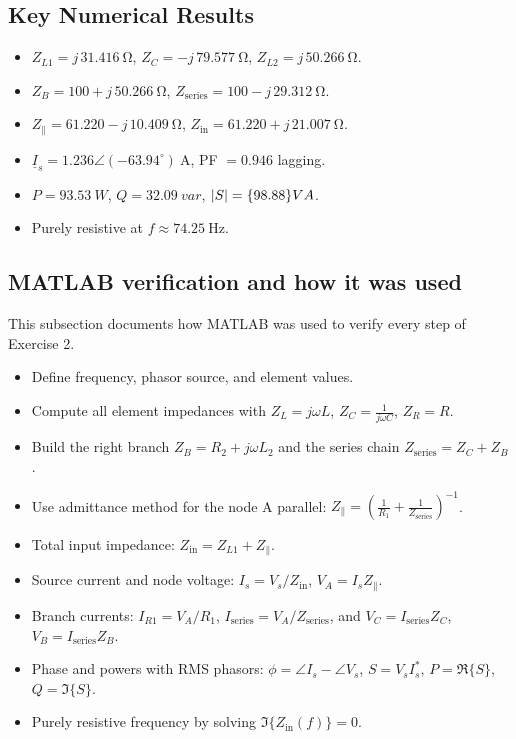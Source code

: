 \documentclass{article}
\begin{document}
\subsection*{Key Numerical Results}

\begin{itemize}
\item $Z_{L1}=j\,31.416\ \si{\ohm}$, $Z_C=-j\,79.577\ \si{\ohm}$, $Z_{L2}=j\,50.266\ \si{\ohm}$.
\item $Z_B=100+j\,50.266\ \si{\ohm}$, \quad $Z_{\text{series}}=100-j\,29.312\ \si{\ohm}$.
\item $Z_{\parallel}=61.220-j\,10.409\ \si{\ohm}$, \quad $Z_{\text{in}}=61.220+j\,21.007\ \si{\ohm}$.
\item $\underline{I}_s=1.236\angle(-63.94^\circ)\ \si{\ampere}$, PF $=0.946$ lagging.
\item $P=\qty{93.53}{W}$, $Q=\qty{32.09}{var}$, $\abs{S}=\qty{98.88}{VA}$.
\item Purely resistive at $f\approx\qty{74.25}{\hertz}$.
\end{itemize}


\subsection{MATLAB verification and how it was used}

This subsection documents how MATLAB was used to verify every step of Exercise 2.

\begin{itemize}
\item Define frequency, phasor source, and element values.
\item Compute all element impedances with $Z_L=j\omega L$, $Z_C=\frac{1}{j\omega C}$, $Z_R=R$.
\item Build the right branch $Z_B=R_2+j\omega L_2$ and the series chain $Z_{\text{series}}=Z_C+Z_B$.
\item Use admittance method for the node A parallel: $Z_{\parallel}=\left(\frac{1}{R_1}+\frac{1}{Z_{\text{series}}}\right)^{-1}$.
\item Total input impedance: $Z_{\text{in}}=Z_{L1}+Z_{\parallel}$.
\item Source current and node voltage: $I_s=V_s/Z_{\text{in}}$, $V_A=I_s Z_{\parallel}$.
\item Branch currents: $I_{R1}=V_A/R_1$, $I_{\text{series}}=V_A/Z_{\text{series}}$, and $V_C=I_{\text{series}}Z_C$, $V_B=I_{\text{series}}Z_B$.
\item Phase and powers with RMS phasors: $\phi=\angle I_s-\angle V_s$, $S=V_s I_s^{*}$, $P=\Re\{S\}$, $Q=\Im\{S\}$.
\item Purely resistive frequency by solving $\Im\{Z_{\text{in}}(f)\}=0$.
\end{itemize}
\end{document}

